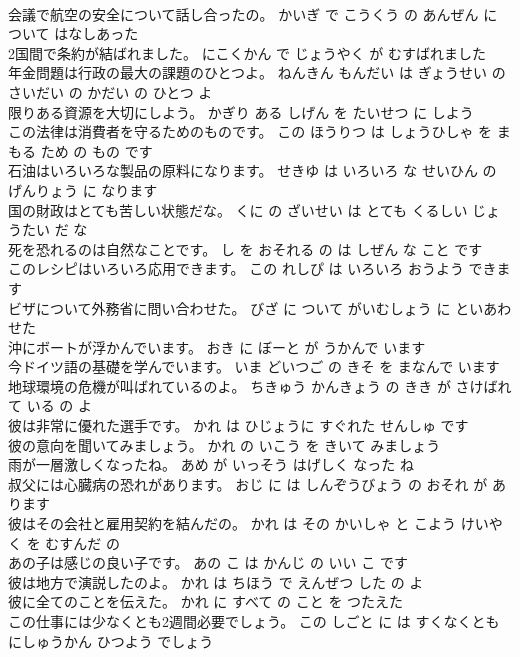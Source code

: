 \documentclass[8pt]{extreport}
\begin{document}
\begin{CJK}{UTF8}{min}
\\	会議で航空の安全について話し合ったの。	かいぎ で こうくう の あんぜん に ついて はなしあった 
\\	2国間で条約が結ばれました。	にこくかん で じょうやく が むすばれました 
\\	年金問題は行政の最大の課題のひとつよ。	ねんきん もんだい は ぎょうせい の さいだい の かだい の ひとつ よ 
\\	限りある資源を大切にしよう。	かぎり ある しげん を たいせつ に しよう 
\\	この法律は消費者を守るためのものです。	この ほうりつ は しょうひしゃ を まもる ため の もの です 
\\	石油はいろいろな製品の原料になります。	せきゆ は いろいろ な せいひん の げんりょう に なります 
\\	国の財政はとても苦しい状態だな。	くに の ざいせい は とても くるしい じょうたい だ な 
\\	死を恐れるのは自然なことです。	し を おそれる の は しぜん な こと です 
\\	このレシピはいろいろ応用できます。	この れしぴ は いろいろ おうよう できます 
\\	ビザについて外務省に問い合わせた。	びざ に ついて がいむしょう に といあわせた 
\\	沖にボートが浮かんでいます。	おき に ぼーと が うかんで います 
\\	今ドイツ語の基礎を学んでいます。	いま どいつご の きそ を まなんで います 
\\	地球環境の危機が叫ばれているのよ。	ちきゅう かんきょう の きき が さけばれて いる の よ 
\\	彼は非常に優れた選手です。	かれ は ひじょうに すぐれた せんしゅ です 
\\	彼の意向を聞いてみましょう。	かれ の いこう を きいて みましょう 
\\	雨が一層激しくなったね。	あめ が いっそう はげしく なった ね 
\\	叔父には心臓病の恐れがあります。	おじ に は しんぞうびょう の おそれ が あります 
\\	彼はその会社と雇用契約を結んだの。	かれ は その かいしゃ と こよう けいやく を むすんだ の 
\\	あの子は感じの良い子です。	あの こ は かんじ の いい こ です 
\\	彼は地方で演説したのよ。	かれ は ちほう で えんぜつ した の よ 
\\	彼に全てのことを伝えた。	かれ に すべて の こと を つたえた 
\\	この仕事には少なくとも2週間必要でしょう。	この しごと に は すくなくとも にしゅうかん ひつよう でしょう 

\end{CJK}
\end{document}
